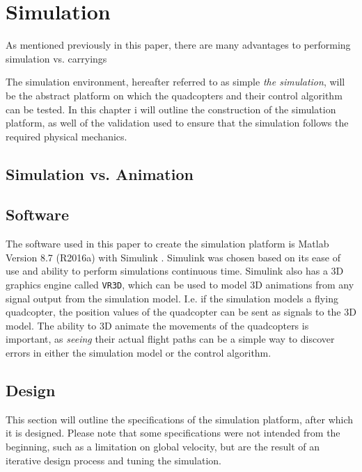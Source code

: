 
\chapter{Simulation}
\label{chap:simulation}
As mentioned previously in this paper, there are many advantages to performing simulation vs. carryings 


The simulation environment, hereafter referred to as simple \textit{the simulation}, will be the abstract platform on which the quadcopters and their control algorithm can be tested. 
In this chapter i will outline the construction of the simulation platform, as well of the validation used to ensure that the simulation follows the required physical mechanics. 

\section{Simulation vs. Animation}
\label{sec:simulation_animation}


\section{Software}
The software used in this paper to create the simulation platform is Matlab Version 8.7 (R2016a) with Simulink \cite{_matlab_2016}. Simulink was chosen based on its ease of use and ability to perform simulations continuous time. Simulink also has a 3D graphics engine called \texttt{VR3D}\cite{_matlab_2016}, which can be used to model 3D animations from any signal output from the simulation model. I.e. if the simulation models a flying quadcopter, the position values of the quadcopter can be sent as signals to the 3D model. The ability to 3D animate the movements of the quadcopters is important, as \textit{seeing} their actual flight paths can be a simple way to discover errors in either the simulation model or the control algorithm. 

\section{Design}
\label{sec:design}
This section will outline the specifications of the simulation platform, after which it is designed. Please note that some specifications were not intended from the beginning, such as a limitation on global velocity, but are the result of an iterative design process and tuning the simulation. 

